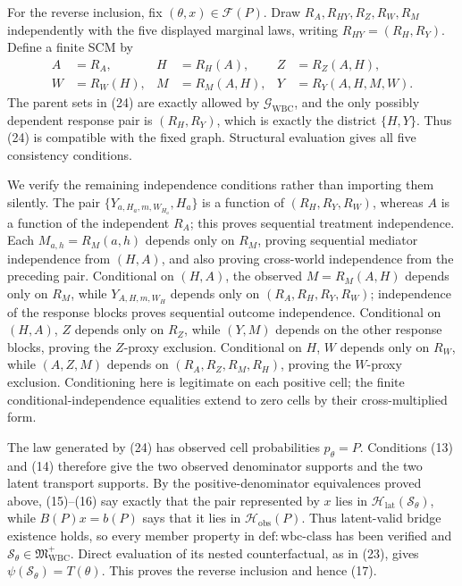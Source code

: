 For the reverse inclusion, fix \((\theta,x)\in\mathcal F(P)\).  Draw
\(R_A,R_{HY},R_Z,R_W,R_M\) independently with the five displayed marginal
laws, writing \(R_{HY}=(R_H,R_Y)\).  Define a finite SCM by
\[
\begin{aligned}
 A&=R_A,& H&=R_H(A),& Z&=R_Z(A,H),\\
 W&=R_W(H),& M&=R_M(A,H),& Y&=R_Y(A,H,M,W).
\end{aligned}
 \tag{24}
\]
The parent sets in (24) are exactly allowed by
\(\mathcal G_{\mathrm{WBC}}\), and the only possibly dependent response pair is
\((R_H,R_Y)\), which is exactly the district \(\{H,Y\}\).  Thus (24) is
compatible with the fixed graph.  Structural evaluation gives all five
consistency conditions.

We verify the remaining independence conditions rather than importing them
silently.  The pair
\(\{Y_{a,H_a,m,W_{H_a}},H_a\}\) is a function of
\((R_H,R_Y,R_W)\), whereas \(A\) is a function of the independent \(R_A\);
this proves sequential treatment independence.  Each \(M_{a,h}=R_M(a,h)\)
depends only on \(R_M\), proving sequential mediator independence from
\((H,A)\), and also proving cross-world independence from the preceding pair.
Conditional on \((H,A)\), the observed \(M=R_M(A,H)\) depends only on
\(R_M\), while \(Y_{A,H,m,W_H}\) depends only on
\((R_A,R_H,R_Y,R_W)\); independence of the response blocks proves sequential
outcome independence.  Conditional on \((H,A)\), \(Z\) depends only on
\(R_Z\), while \((Y,M)\) depends on the other response blocks, proving the
\(Z\)-proxy exclusion.  Conditional on \(H\), \(W\) depends only on
\(R_W\), while \((A,Z,M)\) depends on \((R_A,R_Z,R_M,R_H)\), proving the
\(W\)-proxy exclusion.  Conditioning here is legitimate on each positive cell;
the finite conditional-independence equalities extend to zero cells by their
cross-multiplied form.

The law generated by (24) has observed cell probabilities \(p_\theta=P\).
Conditions (13) and (14) therefore give the two observed denominator supports and
the two latent transport supports.  By the positive-denominator equivalences
proved above, (15)--(16) say exactly that the pair represented by \(x\) lies in
\(\mathcal H_{\mathrm{lat}}(\mathcal S_\theta)\), while
\(B(P)x=b(P)\) says that it lies in
\(\mathcal H_{\mathrm{obs}}(P)\).  Thus latent-valid bridge existence holds, so
every member property in \(\mathrm{def{:}wbc\text{-}class}\) has been verified
and \(\mathcal S_\theta\in\mathfrak M_{\mathrm{WBC}}^{+}\).  Direct evaluation
of its nested counterfactual, as in (23), gives
\(\psi(\mathcal S_\theta)=T(\theta)\).  This proves the reverse inclusion and
hence (17).

